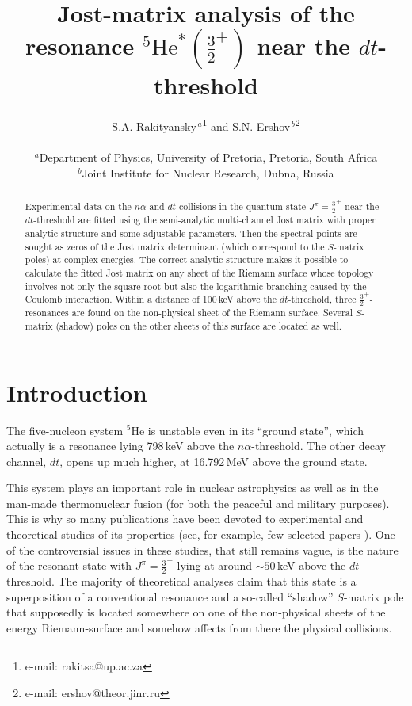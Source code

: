 \documentclass[12pt]{article}
\begin{document}
\sffamily
\title{
Jost-matrix analysis of the resonance
${}^5\mathrm{He}^*(\frac32^+)$ near the $dt$-threshold
}
\author{
S.A. Rakityansky$^{\,a}$\footnote{e-mail: rakitsa@up.ac.za}\quad
and\quad
S.N. Ershov$^{\,b}$\footnote{e-mail: ershov@theor.jinr.ru}\\[3mm]
\parbox{11cm}{%
${}^a${\small Department of Physics, University of Pretoria, Pretoria,
South Africa}\\
${}^b${\small Joint Institute for Nuclear Research, Dubna, Russia}
}
}
\maketitle
\begin{abstract}
\noindent
Experimental data on the $n\alpha$ and $dt$ collisions in the quantum state 
$J^\pi=\frac32^+$ near the $dt$-threshold are fitted using the semi-analytic 
multi-channel Jost matrix with proper analytic structure and some adjustable 
parameters. Then the spectral points are sought as zeros of the Jost matrix 
determinant (which correspond to the $S$-matrix poles) at complex energies. The 
correct analytic structure makes it possible to calculate the fitted Jost matrix 
on any sheet of the Riemann surface whose topology involves not only the 
square-root but also the logarithmic branching caused by the Coulomb 
interaction. Within a distance of 100\,keV above the $dt$-threshold, three 
$\frac32^+$-resonances are found on the non-physical sheet of the Riemann 
surface. Several $S$-matrix (shadow) poles on the other sheets of this surface 
are located as well.
\end{abstract}

\section{Introduction}
The five-nucleon system ${}^5\mathrm{He}$ is unstable even in its ``ground
state'', which actually is a resonance lying 798\,keV above the
$n\alpha$-threshold\cite{Tilley}. The other decay channel, $dt$, opens up
much higher, at 16.792\,MeV above the ground state\cite{Tilley}.

This system plays an important role in nuclear astrophysics as well as in the
man-made thermonuclear fusion (for both the peaceful and military purposes).
This is why so many publications have been devoted to experimental and
theoretical studies of its properties
(see, for example, few selected papers
\cite{
Haesner,
Jarmie,
Brown,
PRL59,
Karnakov,
Bogdanova,
CsotoLovas,
Efros,
CsotoHale,
Barker,
Drosg,
Hoop,
Navratil,
BrownHale,
HaleBrown,
Hoop15,
betan}).
One of the controversial issues in
these studies, that still remains vague, is the nature of the resonant state
with $J^\pi=\frac32^+$ lying at around $\sim50$\,keV above the $dt$-threshold.
The majority of theoretical analyses claim that this state is a superposition
of a conventional resonance and a so-called ``shadow''
$S$-matrix pole that supposedly is located somewhere on one of the
non-physical sheets of the energy Riemann-surface and somehow affects from there
the physical collisions.
\end{document}
